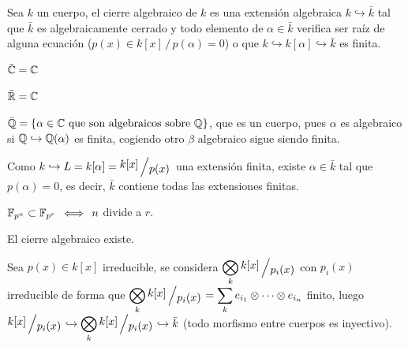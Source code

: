 \begin{defi}
    Sea $k$ un cuerpo, el cierre algebraico de $k$ es una extensi\'on algebraica $k \hookrightarrow \bar k$ tal que $\bar k$ es algebraicamente cerrado y todo elemento de $\alpha \in \bar k$  verifica ser ra\'iz de alguna ecuaci\'on ($p(x)\in k[x]\, /\, p(\alpha) =0$) o que $k \hookrightarrow k[\alpha] \hookrightarrow \bar k$ es finita.
\end{defi}
\begin{ejem}
    $\bar {\mathbb{C}} = \mathbb{C}$

    $\bar {\mathbb{R}} = \mathbb{C}$

    $\bar {\mathbb{Q}} = \{\alpha \in \mathbb{C} \text{ que son algebraicos sobre } \mathbb{Q}\}$, que es un cuerpo, pues $\alpha$ es algebraico si $\mathbb{Q} \hookrightarrow \mathbb{Q}(\alpha)$ es finita, cogiendo otro $\beta$ algebraico sigue siendo finita. 

    Como $k \hookrightarrow L = k[\alpha ] = \modulo{k[x]}{p(x)}$ una extensi\'on finita, existe $\alpha \in \bar k$ tal que $p(\alpha) = 0$, es decir, $\bar k$ contiene todas las extensiones finitas.

    $\mathbb{F}_{p^n} \subset \mathbb{F}_{p^r} \, \iff \, n$ divide a $r$. 
\end{ejem}
\begin{teo}
    El cierre algebraico existe. 
\end{teo}
\begin{dem}
    Sea $p(x) \in k[x]$ irreducible, se considera $\displaystyle \bigotimes_k \modulo{k[x]}{p_i(x)}$ con $p_i(x)$ irreducible de forma que $\displaystyle \bigotimes_k \modulo{k[x]}{p_i(x)} = \sum_k e_{i_1} \otimes \cdots \otimes e_{i_n}$ finito, luego $\displaystyle  \modulo{k[x]}{p_i(x)} \hookrightarrow \bigotimes_k \modulo{k[x]}{p_i(x)} \hookrightarrow \bar k$ (todo morfismo entre cuerpos es inyectivo). 
\end{dem}

